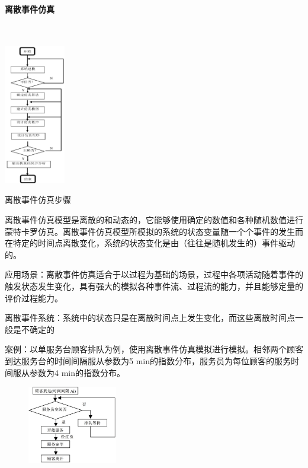 \paragraph{离散事件仿真}~{} \par
\begin{table}
    \centering
    \vspace{-2em}
    \includegraphics[width=0.2\textwidth]{images/离散事件仿真主要步骤.png}
    \caption*{离散事件仿真步骤}
    \vspace{-5em}
\end{table}
离散事件仿真模型是离散的和动态的，它能够使用确定的数值和各种随机数值进行蒙特卡罗仿真。离散事件仿真模型所模拟的系统的状态变量随一个个事件的发生而在特定的时间点离散变化，系统的状态变化是由（往往是随机发生的）事件驱动的。

应用场景：离散事件仿真适合于以过程为基础的场景，过程中各项活动随着事件的触发状态发生变化，具有强大的模拟各种事件流、过程流的能力，并且能够定量的评价过程能力。

离散事件系统：系统中的状态只是在离散时间点上发生变化，而这些离散时间点一般是不确定的

案例：以单服务台顾客排队为例，使用离散事件仿真模拟进行模拟。相邻两个顾客到达服务台的时间间隔服从参数为5 min的指数分布，服务员为每位顾客的服务时间服从参数为4 min的指数分布。

\begin{figure}[H]
    \vspace{-0.5em}
	\centering
	\includegraphics[width=0.35\textwidth]{images/离散事件仿真示例.png}
    \vspace{-1em}
\end{figure}

